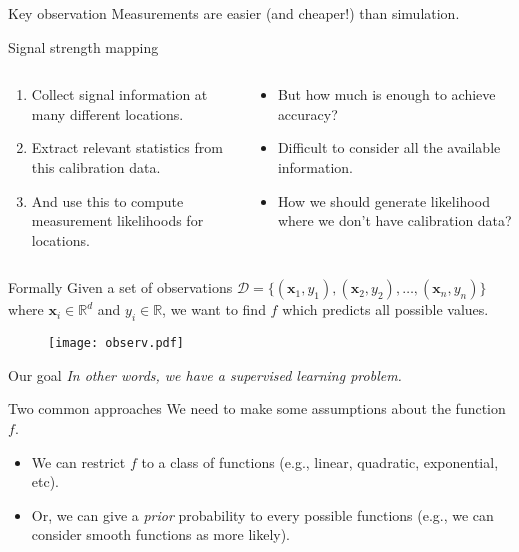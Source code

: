 \documentclass{beamer}
\begin{document}
\begin{frame}{Key observation}
  Measurements are easier (and cheaper!) than simulation.
\end{frame}

\begin{frame}{Signal strength mapping}
  \begin{columns}
    \begin{column}{0.5\textwidth}
      \begin{enumerate}
      \item Collect signal information at many different locations.
      \item Extract relevant statistics from this calibration data.
      \item And use this to compute measurement likelihoods for locations.
      \end{enumerate}
    \end{column}
    \pause
    \begin{column}{0.5\textwidth}
      \begin{itemize}
      \item But how much is enough to achieve accuracy?
        \pause
      \item Difficult to consider all the available information.
        \pause
      \item How we should generate likelihood where we don't have 
        calibration data?
      \end{itemize}
    \end{column}
  \end{columns}
\end{frame}

\begin{frame}{Formally}
  Given a set of observations $\mathcal{D} = \{(\mathbf{x}_1,y_1),
  (\mathbf{x}_2,y_2), \dots, (\mathbf{x}_n,y_n)\}$ where
  $\mathbf{x}_i\in\mathbb{R}^d$ and $y_i\in\mathbb{R}$, we want to find
  $f$ which predicts all possible values.
  \pause
  \begin{figure}
    \centering
    \texttt{[image: observ.pdf]}
  \end{figure}
\end{frame}

\begin{frame}{Our goal}
  \emph{In other words, we have a supervised learning problem.}
\end{frame}

\begin{frame}{Two common approaches}
  We need to make some assumptions about the function $f$.
  \begin{itemize}
  \item We can restrict $f$ to a class of functions (e.g., linear, quadratic,
    exponential, etc).
  \item Or, we can give a \emph{prior} probability to every possible functions
    (e.g., we can consider smooth functions as more likely).
  \end{itemize}
\end{frame}
\end{document}
